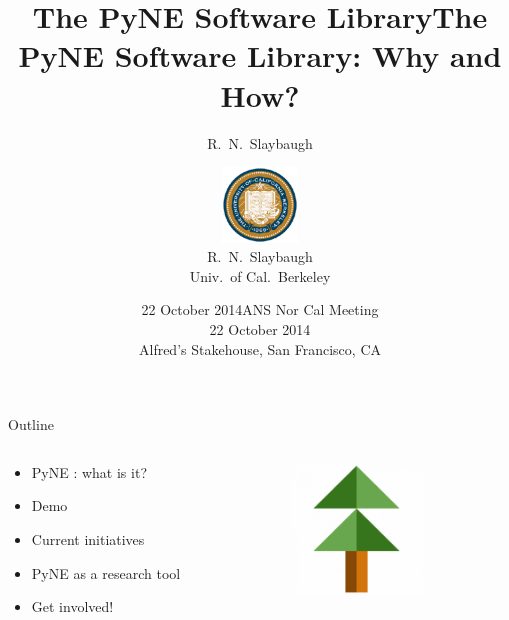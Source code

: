 \documentclass[xcolor=x11names,compress]{beamer}
\title{The PyNE Software Library}
\author{R.\ N.\ Slaybaugh}
\date{22 October 2014}
\renewcommand{\(}{\begin{columns}}
\renewcommand{\)}{\end{columns}}
\newcommand{\<}[1]{\begin{column}{#1}}
\renewcommand{\>}{\end{column}}
\begin{document}
\begin{frame}
\title{The PyNE Software Library: Why and How?}
\author{
        \includegraphics[height=2cm]{../bk}\\R.\ N.\ Slaybaugh \\ Univ.\ of Cal.\ Berkeley}

\date{ANS Nor Cal Meeting \\ 22 October 2014\\ Alfred's Stakehouse, San Francisco, CA}
\titlepage
\end{frame}

\begin{frame}{Outline}

	\begin{columns}
  	\begin{column}{0.4\textwidth}
	    \begin{itemize}
        \item PyNE \cite{pyne}: what is it?
        \item Demo
        \item Current initiatives
        \item PyNE as a research tool
        \item Get involved!
	    \end{itemize}
  	\end{column}
 	\begin{column}{0.5\textwidth}
 	   \begin{center}
 	   \begin{figure}
       \includegraphics[height=3.5cm]{pyne-icon-big}
	   \end{figure}
 	   \end{center}
  	\end{column}
	\end{columns}

\end{frame}
\end{document}
